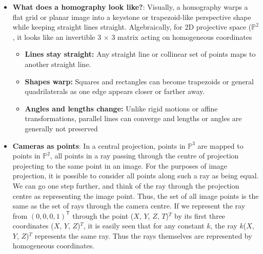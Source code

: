 \documentclass{report}
\begin{document}
\begin{itemize}
            \bigbreak \noindent 
            A singular matrix has a non-trivial null space (kernel)—a set of non-zero vectors that get mapped straight to the zero vector \(\mathbf{0}\). Geometrically, this means an entire line or plane of points collapses into a single point, or becomes completely undefined in projective space (since \(\mathbf{0}\) is not a valid homogeneous coordinate).
            \bigbreak \noindent 
            In a valid \(\mathbb{P}^2 \to \mathbb{P}^2\) homography, three non-collinear points always map to three non-collinear points. If the 3 × 3 matrix is singular (rank 2 or 1), it squashes the entire 2D plane onto a single line or a single point, destroying the structure of the shapes. • Because distinct points get merged into the same output, you cannot reverse the transformation to recover the original geometry.
        \item \textbf{What does a homography look like?}: Visually, a homography warps a flat grid or planar image into a keystone or trapezoid-like perspective shape while keeping straight lines straight. Algebraically, for 2D projective space (\(\mathbb{P}^{2}\), it looks like an invertible 3 $\times$ 3 matrix acting on homogeneous coordinates
            \begin{itemize}
                \item \textbf{Lines stay straight:} Any straight line or collinear set of points maps to another straight line.
                \item \textbf{Shapes warp:} Squares and rectangles can become trapezoids or general quadrilaterals as one edge appears closer or farther away.
                \item \textbf{Angles and lengths change:} Unlike rigid motions or affine transformations, parallel lines can converge and lengths or angles are generally not preserved
            \end{itemize}
        \item \textbf{Cameras as points}: In a central projection, points in $\mathbb{P}^{3}$ are mapped to points in $\mathbb{P}^{2}$, all points in a ray passing through the centre of projection projecting to the same point in an image. For the purposes of image projection, it is possible to consider all points along such a ray as being equal. We can go one step further, and think of the ray through the projection centre as representing the image point. Thus, the set of all image points is the same as the set of rays through the camera centre. If we represent the ray from $(0, 0, 0, 1)^{\mathsf{T}}$ through the point ($X$, $ Y$, $ Z$, $ T$)$^{T}$ by its first three coordinates ($X$, $ Y$, $ Z$)$^{T}$, it is easily seen that for any constant $k$, the ray $k$($X$, $ Y$, $ Z$)$^{T}$ represents the same ray. Thus the rays themselves are represented by homogeneous coordinates.

\end{itemize}
\end{document}
